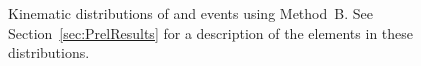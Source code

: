 \documentclass[12pt,twoside,letterpaper,doublespace]{article}
\begin{document}
\begin{figure}[h!]
\centering
\caption[Method B \phoonejet]{Kinematic distributions of \phoonejet and \photwojet events using \mbox{Method B}. See Section~\ref{sec:PrelResults} for a description of the elements in these distributions.}
\subfigure[]

\end{figure}
\end{document}
